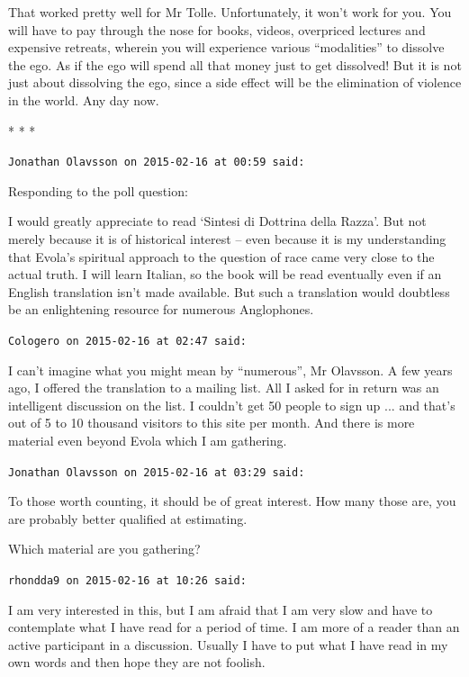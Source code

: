That worked pretty well for Mr Tolle. Unfortunately, it won't work for you. You will have to pay through the nose for books, videos, overpriced lectures and expensive retreats, wherein you will experience various ``modalities'' to dissolve the ego. As if the ego will spend all that money just to get dissolved! But it is not just about dissolving the ego, since a side effect will be the elimination of violence in the world. Any day now.



\begin{center}* * *\end{center}

\begin{footnotesize}
\begin{sffamily}
\texttt{Jonathan Olavsson on 2015-02-16 at 00:59 said:}

Responding to the poll question:

I would greatly appreciate to read `Sintesi di Dottrina della Razza'. But not merely because it is of historical interest -- even because it is my understanding that Evola's spiritual approach to the question of race came very close to the actual truth. I will learn Italian, so the book will be read eventually even if an English translation isn't made available. But such a translation would doubtless be an enlightening resource for numerous Anglophones.

\hfill

\texttt{Cologero on 2015-02-16 at 02:47 said:}

I can't imagine what you might mean by ``numerous'', Mr Olavsson. A few years ago, I offered the translation to a mailing list. All I asked for in return was an intelligent discussion on the list. I couldn't get 50 people to sign up ... and that's out of 5 to 10 thousand visitors to this site per month. And there is more material even beyond Evola which I am gathering.

\hfill

\texttt{Jonathan Olavsson on 2015-02-16 at 03:29 said:}

To those worth counting, it should be of great interest. How many those are, you are probably better qualified at estimating.

Which material are you gathering?

\hfill

\texttt{rhondda9 on 2015-02-16 at 10:26 said:}

I am very interested in this, but I am afraid that I am very slow and have to contemplate what I have read for a period of time. I am more of a reader than an active participant in a discussion. Usually I have to put what I have read in my own words and then hope they are not foolish.


\end{sffamily}
\end{footnotesize}
